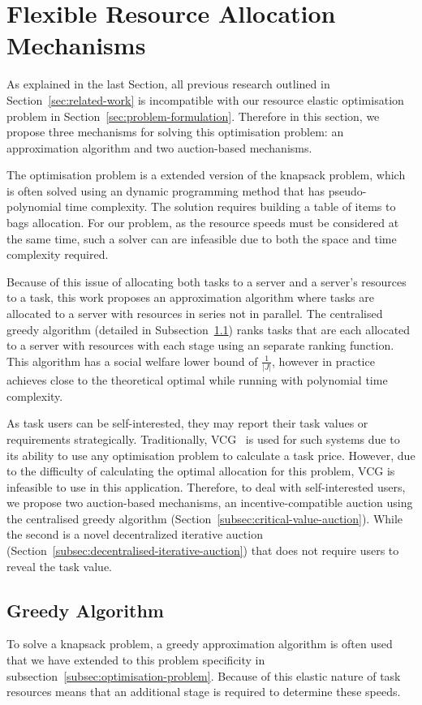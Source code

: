 \section{Flexible Resource Allocation Mechanisms}
\label{sec:flexible-resource-allocation-mechanisms}
As explained in the last Section, all previous research outlined in Section~\ref{sec:related-work} is incompatible
with our resource elastic optimisation problem in Section~\ref{sec:problem-formulation}. Therefore in this
section, we propose three mechanisms for solving this optimisation problem: an approximation algorithm and two
auction-based mechanisms.

The optimisation problem is a extended version of the knapsack problem, which is often solved using an dynamic
programming method that has pseudo-polynomial time complexity. The solution requires building a table of items to bags
allocation. For our problem, as the resource speeds must be considered at the same time, such a solver can are
infeasible due to both the space and time complexity required.

Because of this issue of allocating both tasks to a server and a server's resources to a task, this work proposes an
approximation algorithm where tasks are allocated to a server with resources in series not in parallel. The centralised
greedy algorithm (detailed in Subsection~\ref{subsec:greedy-algorithm}) ranks tasks that are each allocated to a server
with resources with each stage using an separate ranking function. This algorithm has a social welfare lower bound
of $\frac{1}{\left|J\right|}$, however in practice achieves close to the theoretical optimal while running with
polynomial time complexity.

As task users can be self-interested, they may report their task values or requirements strategically. Traditionally,
VCG~\cite{vickrey,Clarke,groves} is used for such systems due to its ability to use any optimisation problem to
calculate a task price. However, due to the difficulty of calculating the optimal allocation for this problem, VCG is
infeasible to use in this application. Therefore, to deal with self-interested users, we propose two auction-based
mechanisms, an incentive-compatible auction using the centralised greedy algorithm
(Section~\ref{subsec:critical-value-auction}). While the second is a novel decentralized iterative
auction (Section~\ref{subsec:decentralised-iterative-auction}) that does not require users to reveal the task value.

\subsection{Greedy Algorithm}
\label{subsec:greedy-algorithm}
To solve a knapsack problem, a greedy approximation algorithm is often used that we have extended to this problem
specificity in subsection~\ref{subsec:optimisation-problem}. Because of this elastic nature of task resources means
that an additional stage is required to determine these speeds.

